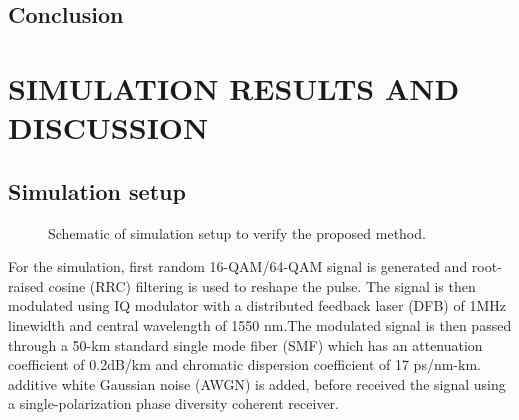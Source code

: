 \documentclass[12pt]{report}
\begin{document}
\section{Conclusion}
\fi
\chapter{SIMULATION RESULTS AND DISCUSSION}

\section{Simulation setup}
\begin{figure}[htbp]
	\caption{Schematic of simulation setup to verify the proposed method.}
	\label{fig:simulation_setup}
\end{figure}

For the simulation, first random 16-QAM/64-QAM signal is generated and root-raised cosine (RRC) filtering is used to reshape the pulse. The signal is then modulated using IQ modulator with a distributed feedback laser (DFB) of 1MHz linewidth and central wavelength of 1550 nm.The modulated signal is then passed through a 50-km standard single mode fiber (SMF) which has an attenuation coefficient of 0.2dB/km and chromatic dispersion coefficient of 17 ps/nm-km. additive white Gaussian noise (AWGN) is added, before received the signal using a single-polarization phase diversity coherent receiver.
\end{document}
